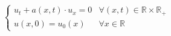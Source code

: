 \vspace{-0.5em}
$$
    \begin{cases}
        u_t + a(x,t) \cdot u_x = 0 & \forall (x,t) \in \mathbb{R} \times \mathbb{R}_+\\
        u(x,0) = u_0(x) & \forall x \in \mathbb{R}
    \end{cases}
$$
